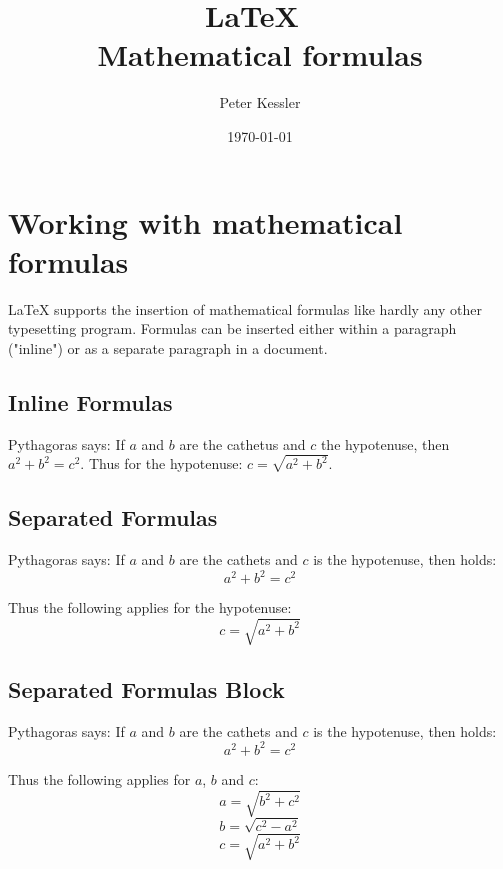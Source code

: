 \documentclass[ 12pt, a4paper, parskip=full]{scrartcl}
\title{\LaTeX\ \\Mathematical formulas}
\author{Peter Kessler}
\date{\today}
\begin{document}
\maketitle
\thispagestyle{empty}

\pagebreak
\tableofcontents

\pagebreak
\section{Working with mathematical formulas}
LaTeX supports the insertion of mathematical formulas like hardly any other typesetting program. Formulas can be inserted either within a paragraph ("inline") or as a separate paragraph in a document.

\subsection{Inline Formulas}
Pythagoras says: If $a$ and $b$ are the 
cathetus and $c$ the hypotenuse, then $a^2+b^2=c^2$. 
Thus for the hypotenuse: $c=\sqrt{a^2+b^2}$.

\subsection{Separated Formulas}
Pythagoras says: If $a$ and $b$ are the cathets and $c$ is the hypotenuse, then holds: 
\begin{displaymath}
  a^2+b^2=c^2 
\end{displaymath}

Thus the following applies for the hypotenuse: 
\begin{displaymath}
  c=\sqrt{a^2+b^2} 
\end{displaymath}

\subsection{Separated Formulas Block}

Pythagoras says: If $a$ and $b$ are the cathets and $c$ is the hypotenuse, then holds: 
\begin{displaymath} %
  a^2+b^2=c^2 
\end{displaymath} 
 
Thus the following applies for $a$, $b$ and $c$: 
\begin{displaymath} %
  a=\sqrt{b^2+c^2} 
\end{displaymath} 
\begin{displaymath} %
  b=\sqrt{c^2-a^2} 
\end{displaymath} 
\begin{displaymath} %
  c=\sqrt{a^2+b^2} 
\end{displaymath} 
\end{document}

